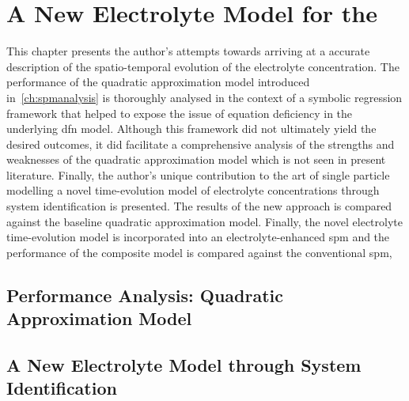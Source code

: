 
\clearpage
\chapter{A New Electrolyte Model for the }\label{ch:newelectrolytemodel}
\startcontents[chapters]

\graphicspath{{6/figures/}}

\bigskip

This   chapter  presents   the   author's  attempts   towards   arriving  at   a
accurate  description  of  the  spatio-temporal  evolution  of  the  electrolyte
concentration. The  performance of the quadratic  approximation model introduced
in~\cref{ch:spmanalysis} is  thoroughly analysed  in the  context of  a symbolic
regression framework that  helped to expose the issue of  equation deficiency in
the underlying \gls{dfn} model. Although this framework did not ultimately yield
the  desired  outcomes,  it  did  facilitate a  comprehensive  analysis  of  the
strengths and weaknesses of the quadratic  approximation model which is not seen
in present literature.  Finally, the author's unique contribution to  the art of
single particle  modelling \viz{}  a novel  time-evolution model  of electrolyte
concentrations through  system identification is  presented. The results  of the
new approach  is compared  against the  baseline quadratic  approximation model.
Finally,  the novel  electrolyte time-evolution  model is  incorporated into  an
electrolyte-enhanced \gls{spm}  and the  performance of  the composite  model is
compared against the conventional \gls{spm},

\section{Performance Analysis: Quadratic Approximation Model}\label{sec:symbolicregression}



\section{A New Electrolyte Model through System Identification}\label{sec:newelectrolytemodel}

